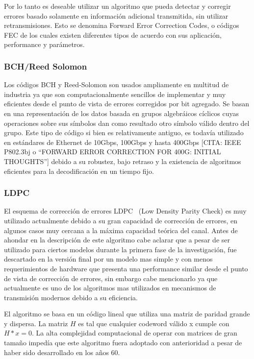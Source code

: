 Por lo tanto es deseable utilizar un algoritmo que pueda detectar y corregir errores basado solamente en información adicional transmitida, sin utilizar retransmisiones. Esto se denomina Forward Error Correction Codes, o códigos FEC \cite{Moon:05} de los cuales existen diferentes tipos de acuerdo con sus aplicación, performance y parámetros.

\subsubsection{BCH/Reed Solomon}
Los códigos BCH y Reed-Solomon son usados ampliamente en multitud de industria ya que son computacionalmente sencillos de implementar y muy eficientes desde el punto de vista de errores corregidos por bit agregado. Se basan en una representación de los datos basada en grupos algebráicos cíclicos cuyas operaciones sobre sus símbolos dan como resultado otro símbolo válido dentro del grupo. 
Este tipo de código si bien es relativamente antiguo, es todavía utilizado en estándares de Ethernet de 10Gbps, 100Gbps y hasta 400Gbps [CITA: IEEE P802.3bj  o ``FORWARD ERROR CORRECTION FOR 400G: INITIAL THOUGHTS''] debido a su robustez, bajo retraso y la existencia de algoritmos eficientes para la decodificación en un tiempo fijo.

\subsubsection{LDPC}
El esquema de corrección de errores LDPC~\cite{gallagerpress} (Low Density Parity Check) es muy utilizado actualmente debido a su gran capacidad de corrección de errores, en algunos casos muy cercana a la máxima capacidad teórica del canal.
Antes de ahondar en la descripción de este algoritmo cabe aclarar que a pesar de ser utilizado para ciertos modelos durante la primera fase de la investigación, fue descartado en la versión final por un modelo mas simple y con menos requerimientos de hardware que presenta una performance similar desde el punto de vista de corrección de errores, sin embargo cabe mencionarlo ya que actualmente es uno de los algoritmos mas utilizados en mecanismos de transmisión modernos debido a su eficiencia. 

El algoritmo se basa en un código lineal que utiliza una matriz de paridad grande y dispersa. La matriz $H$ es tal que cualquier codeword válido x cumple con $H*x=0$. La alta complejidad computacional de operar con matrices de gran tamaño impedía que este algoritmo fuera adoptado con anterioridad a pesar de haber sido desarrollado en los años 60.

